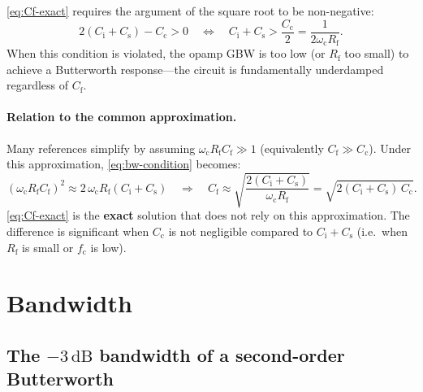 \documentclass[a4paper,11pt]{article}
\begin{document}
\eqref{eq:Cf-exact} requires the argument of the square root to be
non-negative:
\begin{equation*}
  2(C_{\mathrm{i}} + C_{\mathrm{s}}) - C_{\mathrm{c}} > 0
  \quad\Longleftrightarrow\quad
  C_{\mathrm{i}} + C_{\mathrm{s}}
  > \frac{C_{\mathrm{c}}}{2}
  = \frac{1}{2\omega_{\mathrm{c}} R_{\mathrm{f}}}.
\end{equation*}
When this condition is violated, the opamp GBW is too low (or
$R_{\mathrm{f}}$ too small) to achieve a Butterworth response---the
circuit is fundamentally underdamped regardless of $C_{\mathrm{f}}$.

\paragraph{Relation to the common approximation.}

Many references simplify by assuming
$\omega_{\mathrm{c}} R_{\mathrm{f}} C_{\mathrm{f}} \gg 1$
(equivalently $C_{\mathrm{f}} \gg C_{\mathrm{c}}$).  Under this
approximation, \eqref{eq:bw-condition} becomes:
\begin{equation*}
  (\omega_{\mathrm{c}} R_{\mathrm{f}} C_{\mathrm{f}})^2
  \approx 2\,\omega_{\mathrm{c}} R_{\mathrm{f}}
    (C_{\mathrm{i}} + C_{\mathrm{s}})
  \quad\Longrightarrow\quad
  C_{\mathrm{f}}
  \approx \sqrt{\frac{2(C_{\mathrm{i}} + C_{\mathrm{s}})}
                     {\omega_{\mathrm{c}} R_{\mathrm{f}}}}
  = \sqrt{2(C_{\mathrm{i}} + C_{\mathrm{s}})\,C_{\mathrm{c}}}.
\end{equation*}
\eqref{eq:Cf-exact} is the \textbf{exact} solution that does not rely
on this approximation.  The difference is significant when
$C_{\mathrm{c}}$ is not negligible compared to
$C_{\mathrm{i}} + C_{\mathrm{s}}$ (i.e.\ when $R_{\mathrm{f}}$ is
small or $f_{\mathrm{c}}$ is low).

\section{Bandwidth}
\label{sec:bandwidth}

\subsection{The $-3\,\mathrm{dB}$ bandwidth of a second-order
  Butterworth}
\end{document}
